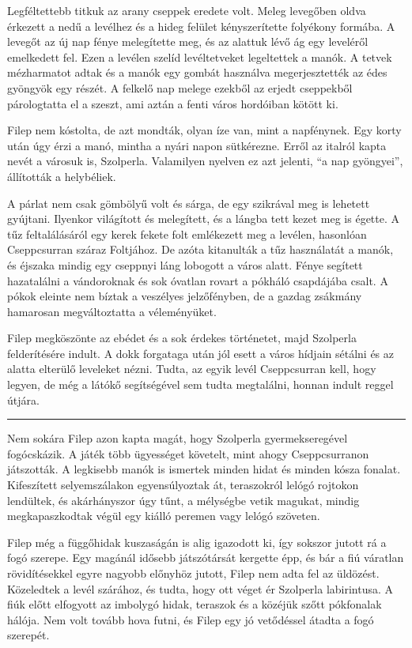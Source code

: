 \documentclass[10pt]{memoir}
\renewcommand{\pfbreakdisplay}{\bigskip \ding{166} \bigskip}
\newcommand{\secbreak}{\fancybreak{\pfbreakdisplay}\indent}
\begin{document}
Legféltettebb titkuk az arany cseppek eredete volt. Meleg levegőben oldva
érkezett a nedű a levélhez és a hideg felület kényszerítette folyékony formába.
A levegőt az új nap fénye melegítette meg, és az alattuk lévő ág egy leveléről
emelkedett fel. Ezen a levélen szelíd levéltetveket legeltettek a manók. A
tetvek mézharmatot adtak és a manók egy gombát használva megerjesztették az
édes gyöngyök egy részét. A felkelő nap melege ezekből az erjedt cseppekből
párologtatta el a szeszt, ami aztán a fenti város hordóiban kötött ki.

Filep nem kóstolta, de azt mondták, olyan íze van, mint a napfénynek. Egy korty
után úgy érzi a manó, mintha a nyári napon sütkérezne. Erről az italról kapta
nevét a városuk is, Szolperla. Valamilyen nyelven ez azt jelenti, “a nap
gyöngyei”, állították a helybéliek.

A párlat nem csak gömbölyű volt és sárga, de egy szikrával meg is lehetett
gyújtani. Ilyenkor világított és melegített, és a lángba tett kezet meg is
égette. A tűz feltalálásáról egy kerek fekete folt emlékezett meg a levélen,
hasonlóan Cseppcsurran száraz Foltjához. De azóta kitanulták a tűz használatát
a manók, és éjszaka mindig egy cseppnyi láng lobogott a város alatt. Fénye
segített hazatalálni a vándoroknak és sok óvatlan rovart a pókháló csapdájába
csalt. A pókok eleinte nem bíztak a veszélyes jelzőfényben, de a gazdag
zsákmány hamarosan megváltoztatta a véleményüket.

Filep megköszönte az ebédet és a sok érdekes történetet, majd Szolperla
felderítésére indult. A dokk forgataga után jól esett a város hídjain sétálni
és az alatta elterülő leveleket nézni. Tudta, az egyik levél Cseppcsurran kell,
hogy legyen, de még a látókő segítségével sem tudta megtalálni, honnan indult
reggel útjára.

\secbreak

Nem sokára Filep azon kapta magát, hogy Szolperla gyermekseregével fogócskázik.
A játék több ügyességet követelt, mint ahogy Cseppcsurranon játszották. A
legkisebb manók is ismertek minden hidat és minden kósza fonalat. Kifeszített
selyemszálakon egyensúlyoztak át, teraszokról lelógó rojtokon lendültek, és
akárhányszor úgy tűnt, a mélységbe vetik magukat, mindig megkapaszkodtak végül
egy kiálló peremen vagy lelógó szöveten.

Filep még a függőhidak kuszaságán is alig igazodott ki, így sokszor jutott rá a
fogó szerepe. Egy magánál idősebb játszótársát kergette épp, és bár a fiú
váratlan rövidítésekkel egyre nagyobb előnyhöz jutott, Filep nem adta fel az
üldözést. Közeledtek a levél szárához, és tudta, hogy ott véget ér Szolperla
labirintusa. A fiúk előtt elfogyott az imbolygó hidak, teraszok és a közéjük
szőtt pókfonalak hálója. Nem volt tovább hova futni, és Filep egy jó vetődéssel
átadta a fogó szerepét.
\end{document}
